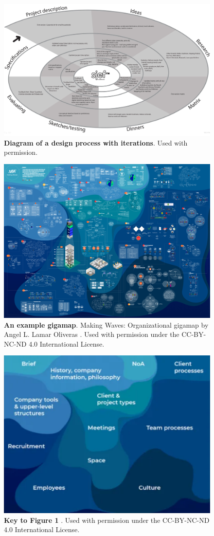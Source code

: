 \begin{figure}[h]
    \centering
    \includegraphics[width=0.65\linewidth]{figures/f18.png}
    \caption[Diagram of a design process with iterations]{\textbf{Diagram of a design process with iterations}. \citep[p. 343]{sevaldson_designing_2022} \citep{sevaldson_designing_2022-1} Used with permission.}
    \label{fig:18}
\end{figure}
\FloatBarrier

\FloatBarrier
\begin{figure}[h]
    \centering
    \includegraphics[width=0.65\linewidth]{figures/f16.png}
    \caption[An example gigamap]{\textbf{An example gigamap}. Making Waves: Organizational gigamap by Angel L. Lamar Oliveras \citep{lamar_oliveras_making_2020}. Used with permission under the CC-BY-NC-ND 4.0 International License.
}
    \label{fig:16}
\end{figure}

\begin{figure}[h]
    \centering
    \includegraphics[width=0.65\linewidth]{figures/f17.png}
    \caption[Key to Figure 1]{ \textbf{Key to Figure 1} \citep{lamar_oliveras_making_2020}. 
Used with permission under the CC-BY-NC-ND 4.0 International License.}
    \label{fig:17}
\end{figure}
\FloatBarrier

